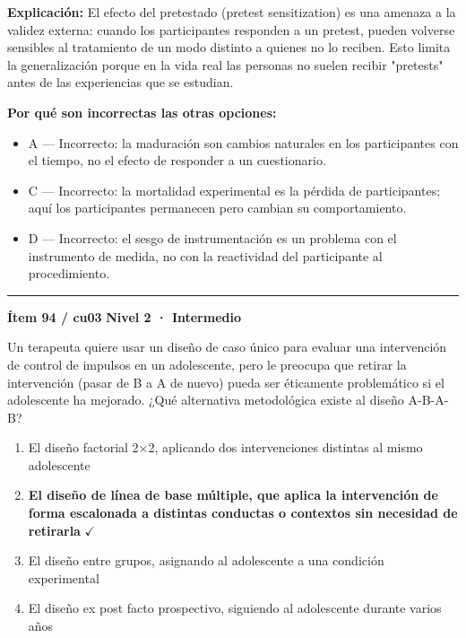 \documentclass[12pt,a4paper]{article}
\begin{document}
\noindent\textbf{\color{azul}Explicación:} El efecto del pretestado (pretest sensitization) es una amenaza a la validez externa: cuando los participantes responden a un pretest, pueden volverse sensibles al tratamiento de un modo distinto a quienes no lo reciben. Esto limita la generalización porque en la vida real las personas no suelen recibir "pretests" antes de las experiencias que se estudian.

\noindent\textbf{\color{gris}Por qué son incorrectas las otras opciones:}
\begin{itemize}
  \item {\small A — Incorrecto: la maduración son cambios naturales en los participantes con el tiempo, no el efecto de responder a un cuestionario.}
  \item {\small C — Incorrecto: la mortalidad experimental es la pérdida de participantes; aquí los participantes permanecen pero cambian su comportamiento.}
  \item {\small D — Incorrecto: el sesgo de instrumentación es un problema con el instrumento de medida, no con la reactividad del participante al procedimiento.}
\end{itemize}
\vspace{8pt}\hrule\vspace{10pt}

\begin{mdframed}[backgroundcolor=fondogris,linecolor=ambar,linewidth=1pt,innerleftmargin=10pt,innerrightmargin=10pt,innertopmargin=7pt,innerbottommargin=7pt]
\textbf{Ítem 94 / cu03} \hfill {\small\bfseries\color{ambar} Nivel 2 · Intermedio}
\end{mdframed}

Un terapeuta quiere usar un diseño de caso único para evaluar una intervención de control de impulsos en un adolescente, pero le preocupa que retirar la intervención (pasar de B a A de nuevo) pueda ser éticamente problemático si el adolescente ha mejorado. ¿Qué alternativa metodológica existe al diseño A-B-A-B?

\begin{enumerate}
  \item[A.] El diseño factorial 2×2, aplicando dos intervenciones distintas al mismo adolescente
  \item[\textbf{\color{verde}B.}] \textbf{\color{verde} El diseño de línea de base múltiple, que aplica la intervención de forma escalonada a distintas conductas o contextos sin necesidad de retirarla} \hfill $\checkmark$
  \item[C.] El diseño entre grupos, asignando al adolescente a una condición experimental
  \item[D.] El diseño ex post facto prospectivo, siguiendo al adolescente durante varios años
\end{enumerate}
\end{document}
